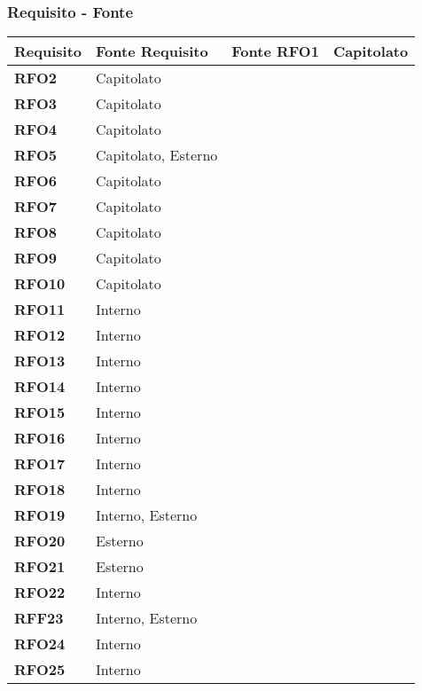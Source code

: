 \subsubsection{Requisito - Fonte}
\begin{longtable}{|>{\centering\arraybackslash}m{}|>{\centering\arraybackslash}m{}|}
	\hline
	\textbf{Requisito} & \textbf{Fonte} 
	\endfirsthead
	\hline
	\textbf{Requisito} & \textbf{Fonte} 
	\endhead
	\hline
	\textbf{RFO1}            & Capitolato\\\hline
	\textbf{RFO2}            & Capitolato\\\hline
	\textbf{RFO3}            & Capitolato\\\hline
	\textbf{RFO4}            & Capitolato\\\hline
	\textbf{RFO5}            & Capitolato, Esterno\\\hline
	\textbf{RFO6}            & Capitolato\\\hline
	\textbf{RFO7}            & Capitolato\\\hline
	\textbf{RFO8}            & Capitolato\\\hline
	\textbf{RFO9}            & Capitolato\\\hline
	\textbf{RFO10}            & Capitolato\\\hline
	\textbf{RFO11}            & Interno\\\hline
	\textbf{RFO12}            & Interno\\\hline
	\textbf{RFO13}            & Interno\\\hline
	\textbf{RFO14}            & Interno\\\hline
	\textbf{RFO15}            & Interno\\\hline
	\textbf{RFO16}            & Interno\\\hline
	\textbf{RFO17}            & Interno\\\hline
	\textbf{RFO18}            & Interno\\\hline
	\textbf{RFO19}            & Interno, Esterno\\\hline
	\textbf{RFO20}            & Esterno\\\hline
	\textbf{RFO21}            & Esterno\\\hline
	\textbf{RFO22}            & Interno\\\hline
	\textbf{RFF23}            & Interno, Esterno\\\hline
	\textbf{RFO24}            & Interno\\\hline
	\textbf{RFO25}            & Interno\\\hline

\end{longtable}
